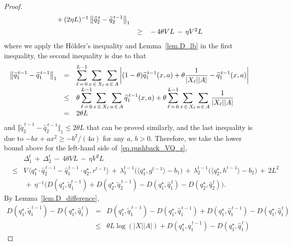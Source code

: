 \documentclass[12pt, final]{l4dc2023}
\begin{document}
\begin{proof}
\[\begin{array}{rcl}
	\,+\, (2\eta L)^{-1} \left\|{\widehat q_2^{\,t} - \widetilde q_2^{\,t-1}}\right\|_1
	\\[0.2cm]
	&\geq& \,-\,4\theta V L\,-\,\eta V^2 L
	\end{array}
	\]
	where we apply the H\"older's inequality and Lemma~\ref{lem.D_lb} in the first inequality, the second inequality is due to that
	\[
	\begin{array}{rcl}
	\left\|{ \widetilde q_1^{\,t-1}- \widehat q_1^{\,t-1}}\right\|_1 
	&=& \displaystyle\sum_{\ell\,=\,0}^{L-1}\sum_{x\,\in\,X_\ell}\sum_{a\,\in\,A}\left| (1-\theta)\widehat {q}_1^{\,t-1}(x,a)+\theta\frac{1}{|X_\ell||A|}-\widehat q_1^{\,t-1}(x,a) \right|
	\\[0.2cm]
	&\leq& \displaystyle \theta\sum_{\ell\,=\,0}^{L-1}\sum_{x\,\in\,X_\ell}\sum_{a\,\in\,A} \widehat {q}_1^{\,t-1}(x,a)+\theta\sum_{\ell\,=\,0}^{L-1}\sum_{x\,\in\,X_\ell}\sum_{a\,\in\,A}\frac{1}{|X_\ell||A|}
	\\[0.2cm]
	&=& 2\theta L
	\end{array}
	\]
	and $\Vert{ \tilde q_2^{\,t-1}- \hat q_2^{\,t-1}}\Vert_1 \leq 2\theta L$ that can be proved similarly, and the last inequality is due to 
	$-bx+ax^2\geq - b^2/(4a)$ for any $a$, $b > 0$. Therefore, we take the lower bound above for the left-hand side of~\eqref{eq.pushback_VQ_s},
	\begin{equation}\label{eq.pushback_simplify_s}
	\begin{array}{rcl}
	&& \!\!\!\! \!\!\!\! \!\!
	\Delta_1^{t} \,+\,\Delta_2^{t} \,-\,4\theta V L\,-\,\eta V^2 L
	\\[0.2cm]
	&\leq& V\, \big\langle{ q_1^\star\cdot \hat q_2^{\,t-1}-\hat q_1^{\,t-1}\cdot  q_2^\star },{r^{t-1}}\big\rangle 
	\,+\,
	\lambda_1^{t-1} \big(\langle{ q_1^\star},{g^{t-1}}\rangle 
	-b_1\big)
	\,+\,
	\lambda_2^{t-1} \big(\langle{ q_2^\star},{h^{t-1}}\rangle -b_2\big)
	\,+\,2L^2
	\\[0.2cm]
	&& \,+\, \eta^{-1} \big(D( q_1^\star,\tilde q_1^{t-1}) + D( q_2^\star, \tilde q_2^{\,t-1}) -D( q_1^\star,\hat q_1^{\,t}) - D( q_2^\star, \hat q_2^{\,t}) \big).
	\end{array}
	\end{equation}
	By Lemma~\ref{lem.D_difference},
	\[
	\begin{array}{rcl}
	D( q_1^\star,\tilde q_1^{\,t-1}) - D( q_1^\star,\hat q_1^{\,t}) &=& D( q_1^\star,\tilde q_1^{\,t-1}) - D( q_1^\star,\hat q_1^{\,t-1})  + D( q_1^\star,\hat q_1^{\,t-1}) - D( q_1^\star,\hat q_1^{\,t}) 
	\\[0.2cm]
	&\leq & \theta L\log (|X||A|)+ D( q_1^\star,\hat q_1^{\,t-1}) - D( q_1^\star,\hat q_1^{\,t}) 

\end{array}\]
\end{proof}
\end{document}
